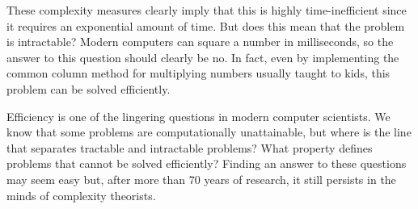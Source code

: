 These complexity measures clearly imply that this \TM is highly time-inefficient since it requires an exponential amount of time. But does this mean that the problem is intractable? Modern computers can square a number in milliseconds, so the answer to this question should clearly be no. In fact, even by implementing the common column method for multiplying numbers usually taught to kids, this problem can be solved efficiently.

Efficiency is one of the lingering questions in modern computer scientists. We know that some problems are computationally unattainable, but where is the line that separates tractable and intractable problems? What property defines problems that cannot be solved efficiently? Finding an answer to these questions may seem easy but, after more than 70 years of research, it still persists in the minds of complexity theorists.

\cleardoublepage